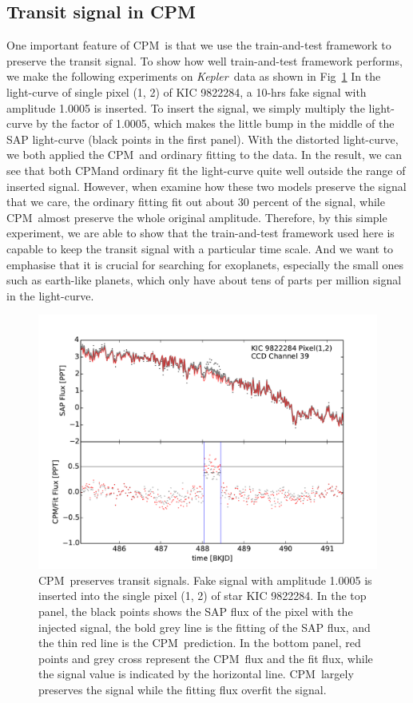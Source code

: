 \documentclass[12pt, preprint]{aastex}
\newcommand{\project}[1]{\textsl{#1}}
\newcommand{\Kepler}{\project{Kepler}}
\newcommand{\name}{CPM}
\begin{document}
\subsection{Transit signal in \name}
One important feature of \name\ is that we use the train-and-test framework to preserve 
the transit signal. To show how well train-and-test framework performs, we make the
following experiments on \Kepler\ data as shown in Fig~\ref{distortion}
In the light-curve of single pixel (1, 2) of KIC 9822284, a 10-hrs fake signal 
with amplitude 1.0005 is inserted. To insert the signal, we simply multiply the light-curve 
by the factor of 1.0005, which makes the little bump in the middle of the SAP light-curve 
(black points in the first panel). With the distorted light-curve, we both applied the 
\name\ and ordinary fitting to the data. In the result, we can see that both \name and 
ordinary fit the light-curve quite well outside the range of inserted signal. However, 
when examine how these two models preserve the signal that we care, the ordinary
fitting fit out about 30 percent of the signal, while \name\ almost preserve the whole 
original amplitude. Therefore,  by this simple experiment, we are able to show that 
the train-and-test framework used here is capable to keep the transit signal with 
a particular time scale. And we want to emphasise that it is crucial for searching for
exoplanets, especially the small ones such as earth-like planets, which only have  
about tens of parts per million signal in the light-curve.

\begin{figure}[htb]
\centering
\includegraphics[width=\columnwidth]{distortion_9822284_normal_bw}
\caption{
  \label{distortion} 
  \name\ preserves transit signals. 
  Fake signal with amplitude 1.0005 is inserted into the single pixel (1, 2) of star KIC 9822284. 
  In the top panel, the black points shows the SAP flux of the pixel with the injected signal, 
    the bold grey line is the fitting of the SAP flux, and the thin red line is the \name\ prediction. 
  In the bottom panel, red points and grey cross represent the \name\ flux and the fit flux, 
    while the signal value is indicated by the horizontal line. 
  \name\ largely preserves the signal while the fitting flux overfit the signal.}
\end{figure}
\end{document}
